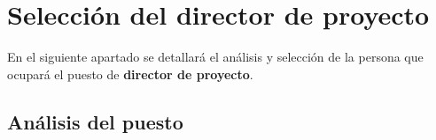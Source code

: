 \section{Selección del director de proyecto}
En el siguiente apartado se detallará el análisis y selección de la persona que ocupará el puesto de \textbf{director de proyecto}.

\subsection{Análisis del puesto}

